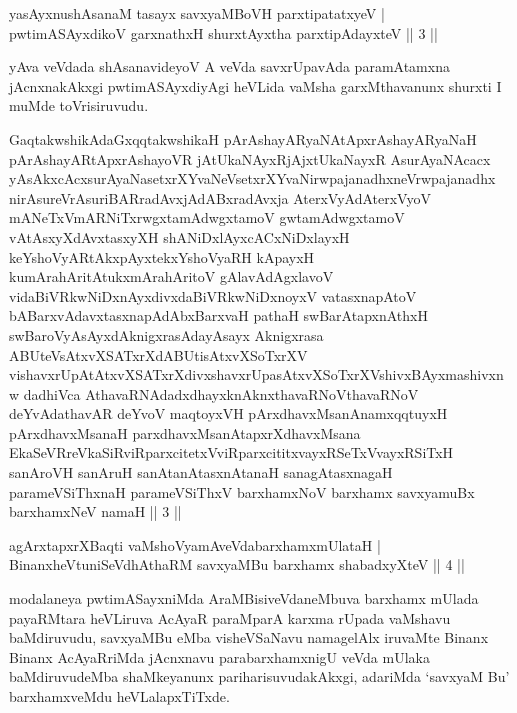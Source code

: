 
\begin{shl}
yasAyxnushAsanaM tasayx savxyaMBoVH parxtipatatxyeV |\\
pwtimASAyxdikoV garxnathxH shurxtAyx\s tha parxtipAdayxteV \hfill || 3 ||
\end{shl}

\begin{artha}
yAva veVdada shAsanavideyoV A veVda savxrUpavAda paramAtamxna jAcnxnakAkxgi pwtimASAyxdiyAgi heVLida vaMsha garxMthavanunx shurxti I muMde toVrisiruvudu.
\end{artha}


\begin{kandikeshl}
GaqtakwshikAdaGxqqtakwshikaH pArAshayARyaNAtApxrAshayARyaNaH pArA\-shayARtApxrAshayoVR jAtUkaNAyxRjAjxtUkaNayxR AsurAyaNAcacx yAsAkxcAcxsurAyaNasetxrXYvaNeVsetxrXYvaNirwpajanadhxneVrwpajanadhx nirAsureVrAsuriBARradAvxjAdABxradAvxja AterxVyAdAterxVyoV mANeTxVmARNiTxrwgxtamAdwgxtamoV gwtamAdwgxtamoV vAtAsxyXdAvxtasxyXH shANiDxlAyxcACxNiDxlayxH keYshoVyARtAkxpAyxtekxYshoVyaRH kApayxH kumArahAritAtukxmArahAritoV gAlavAdAgxlavoV vidaBiVRkwNiDxnAyxdivxdaBiVRkwNiDxnoyxV vatasxnapAtoV bABarxvAdavxtasxnapAdAbxBarxvaH pathaH swBarAtapxnAthxH swBaroV\s yAsAyxdAknigxrasAdayAsayx Aknigxrasa ABUteVsAtxvXSATxrXdABUtisAtxvXSoTxrXV vishavxrUpAtAtxvXSATxrXdivxshavx\break rUpasAtxvXSoTxrXV\s shivxBAyxmashivxnw dadhiVca AthavaRNAdadxdhayxknAknxthavaRNoV\s\break thavaRNoV deYvAdathavAR deYvoV maqtoyxVH pArxdhavxMsanAnamxqqtuyxH pArxdhavxMsanaH parxdhavxMsanAtapxrXdhavxMsana EkaSeVRreVkaSiRviRparxcitetxVviRparxcititxvayxRSeTxVvayxRSiTxH sanAroVH sanAruH sanAtanAtasxnAtanaH sanagAtasxnagaH parameVSiThxnaH parameVSiThxV barxhamxNoV barxhamx savxyamuBx barxhamxNeV namaH || 3 ||
\end{kandikeshl}

\begin{shl}
agArxtapxrXBaqti vaMshoV\s yamAveVdabarxhamxmUlataH |\\
BinanxheVtuniSeVdhAthaRM savxyaMBu barxhamx shabadxyXteV \hfill || 4 ||
\end{shl}

\begin{artha}
modalaneya pwtimASayxniMda AraMBisiveVdaneMbuva barxhamx mUlada
 payaRMtara heVLiruva AcAyaR paraMparA karxma rUpada vaMshavu
baMdiruvudu, savxyaMBu eMba visheVSaNavu namagelAlx iruvaMte Binanx
Binanx AcAyaRriMda jAcnxnavu parabarxhamxnigU veVda mUlaka
baMdiruvudeMba shaMkeyanunx pariharisuvudakAkxgi, adariMda `savxyaM Bu'
barxhamxveMdu heVLalapxTiTxde.
\end{artha}

